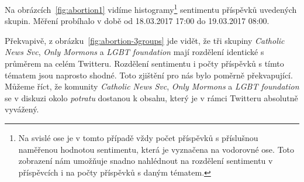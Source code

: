 \documentclass[12pt, a4paper]{article}
\numberwithin{equation}{section} 	%
\begin{document}
Na obrázcích~\autoref{fig:abortion1} vidíme histogramy\footnote{Na svislé ose je v tomto případě vždy počet příspěvků s příslušnou naměřenou hodnotou sentimentu, která je vyznačena na vodorovné ose. Toto zobrazení nám umožňuje snadno nahlédnout na rozdělení sentimentu v příspěvcích i na počty příspěvků s daným tématem.} sentimentu příspěvků uvedených skupin. Měření probíhalo v době od 18.03.2017 17:00 do 19.03.2017 08:00.

Překvapivě, z obrázku~\autoref{fig:abortion-3groups} jde vidět, že tři skupiny \textit{Catholic News Svc}, \textit{Only Mormons} a \textit{LGBT foundation} mají rozdělení identické s průměrem na celém Twitteru. Rozdělení sentimentu i počty příspěvků s tímto tématem jsou naprosto shodné. Toto zjištění pro nás bylo poměrně překvapující. Můžeme říct, že komunity \textit{Catholic News Svc}, \textit{Only Mormons} a \textit{LGBT foundation} se v diskuzi okolo \textit{potratu} dostanou k obsahu, který je v rámci Twitteru absolutně vyvážený.
\end{document}
